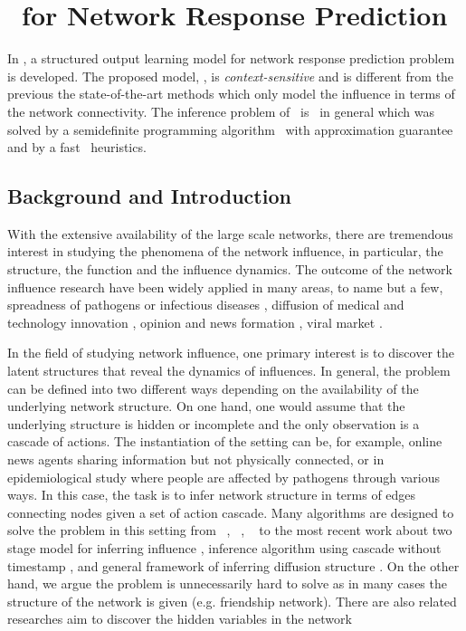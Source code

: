 {%
%
\section{\spin\ for Network Response Prediction}\label{sc_su14b}

In , a structured output learning model for network response prediction problem is developed.
The proposed model, \spin, is \textit{context-sensitive} and is different from the previous the state-of-the-art methods which only model the influence in terms of the network connectivity.
The inference problem of \spin\ is \nphard\ in general which was solved by a semidefinite programming algorithm \sdp\ with approximation guarantee and by a fast \greedy\ heuristics.

\subsection{Background and Introduction}

With the extensive availability of the large scale networks, there are tremendous interest in studying the phenomena of the network influence, in particular, the structure, the function and the influence dynamics. 
The outcome of the network influence research have been widely applied in many areas, to name but a few, spreadness of pathogens or infectious diseases \citep{Hethcote00the,Anderson02infectious}, diffusion of medical and technology innovation \citep{Strang98diffusion,Rogers03the}, opinion and news formation \citep{Adar04implicit,Gruhl04information,Adar05tracking,Leskovec07cascading,Nowell08tracing,Leskovec09meme}, viral market \citep{Domingos01mining,Kempe03maximizing,Liben-Nowell03the}.

In the field of studying network influence, one primary interest is to discover the latent structures that reveal the dynamics of influences.
In general, the problem can be defined into two different ways depending on the availability of the underlying network structure.
On one hand, one would assume that the underlying structure is hidden or incomplete and the only observation is a cascade of actions.
The instantiation of the setting can be, for example, online news agents sharing information but not physically connected, or in epidemiological study where people are affected by pathogens through various ways.
In this case, the task is to infer network structure in terms of edges connecting nodes given a set of action cascade.
Many algorithms are designed to solve the problem in this setting from \netinf\ \citep{GomezRodriguez10inferring}, \netrate\ \citep{Rodrigues11unconvering}, \ \citep{Du12learning} to the most recent work about two stage model for inferring influence \citep{Du14influence}, inference algorithm using cascade without timestamp \citep{Amin14learning}, and general framework of inferring diffusion structure \citep{Daneshmand14estimating}.
On the other hand, we argue the problem is unnecessarily hard to solve as in many cases the structure of the network is given (e.g. friendship network).
There are also related researches aim to discover the hidden variables in the network \citep{Lovrek08prediction,Goyal10learning}

}
